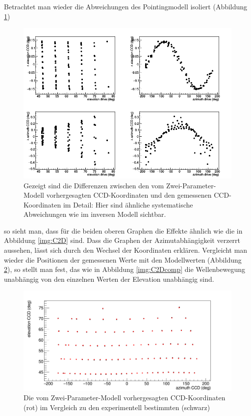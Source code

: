 Betrachtet man wieder die Abweichungen des Pointingmodell isoliert (Abbildung \ref{img:D2C})
\begin{figure}[htbp]
\centering
\includegraphics[width=\textwidth]{../341/D2C.png}
\caption{Gezeigt sind die Differenzen zwischen den vom Zwei-Parameter-Modell vorhergesagten CCD-Koordinaten und den gemessenen CCD-Koordinaten  im Detail: Hier sind ähnliche systematische Abweichungen wie im inversen Modell sichtbar.}
\label{img:D2C}
\end{figure}
so sieht man, dass für die beiden oberen Graphen die Effekte ähnlich wie die in Abbildung \ref{img:C2D} sind. Dass die Graphen der Azimutabhängigkeit verzerrt aussehen, lässt sich durch den Wechsel der Koordinaten erklären. Vergleicht man wieder die Positionen der gemessenen Werte mit den Modellwerten (Abbildung \ref{img:D2Ccomp2}), so stellt man fest, das wie in Abbildung \ref{img:C2Dcomp} die Wellenbewegung unabhängig von den einzelnen Werten der Elevation unabhängig sind.
\begin{figure}[htbp]
\centering
\includegraphics[width=\textwidth]{../341/D2Ccomp2.png}
\caption{Die vom Zwei-Parameter-Modell vorhergesagten CCD-Koordinaten (rot) im Vergleich zu den experimentell bestimmten (schwarz)}
\label{img:D2Ccomp2}
\end{figure}

